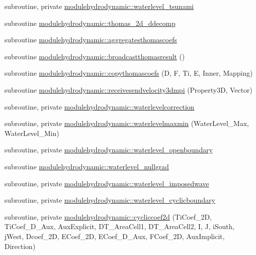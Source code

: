 \begin{DoxyCompactItemize}
subroutine, private \mbox{\hyperlink{namespacemodulehydrodynamic_af4cd55d170e7b64149a737b5bbe9951c}{modulehydrodynamic\+::waterlevel\+\_\+tsunami}}
\item 
subroutine \mbox{\hyperlink{namespacemodulehydrodynamic_ac03117b3b11b92ebf56eb60fad884b0b}{modulehydrodynamic\+::thomas\+\_\+2d\+\_\+ddecomp}}
\item 
subroutine \mbox{\hyperlink{namespacemodulehydrodynamic_a0d43e324a40d96741fa99e647c0d0e01}{modulehydrodynamic\+::aggregatesthomascoefs}}
\item 
subroutine \mbox{\hyperlink{namespacemodulehydrodynamic_a3dc68350b123c83700a52b23bdbf8151}{modulehydrodynamic\+::broadcastthomasresult}} ()
\item 
subroutine \mbox{\hyperlink{namespacemodulehydrodynamic_a080df16267de295975f460ddb4cba152}{modulehydrodynamic\+::copythomascoefs}} (D, F, Ti, E, Inner, Mapping)
\item 
subroutine \mbox{\hyperlink{namespacemodulehydrodynamic_a60fe8dcc9369b6f2caa9b97647a7f605}{modulehydrodynamic\+::receivesendvelocity3dmpi}} (Property3D, Vector)
\item 
subroutine, private \mbox{\hyperlink{namespacemodulehydrodynamic_a1adc02badc9c5130d372cfb28e43f796}{modulehydrodynamic\+::waterlevelcorrection}}
\item 
subroutine, private \mbox{\hyperlink{namespacemodulehydrodynamic_a4c31b8fb87415bace90b12dd41376ef4}{modulehydrodynamic\+::waterlevelmaxmin}} (Water\+Level\+\_\+\+Max, Water\+Level\+\_\+\+Min)
\item 
subroutine, private \mbox{\hyperlink{namespacemodulehydrodynamic_abc3f56e92d973f39a2bde89ee0ee561f}{modulehydrodynamic\+::waterlevel\+\_\+openboundary}}
\item 
subroutine \mbox{\hyperlink{namespacemodulehydrodynamic_a3a81c2f0eddf64c038d5a82241029379}{modulehydrodynamic\+::waterlevel\+\_\+nullgrad}}
\item 
subroutine, private \mbox{\hyperlink{namespacemodulehydrodynamic_a25549ff328b3933642ae5a9112a7d2ba}{modulehydrodynamic\+::waterlevel\+\_\+imposedwave}}
\item 
subroutine, private \mbox{\hyperlink{namespacemodulehydrodynamic_a07cbcb571bac038116c36df1b277df63}{modulehydrodynamic\+::waterlevel\+\_\+cyclicboundary}}
\item 
subroutine, private \mbox{\hyperlink{namespacemodulehydrodynamic_a51f796ba1d401f24370c5f9dd5ec71ae}{modulehydrodynamic\+::cycliccoef2d}} (Ti\+Coef\+\_\+2D, Ti\+Coef\+\_\+D\+\_\+\+Aux, Aux\+Explicit, D\+T\+\_\+\+Area\+Cell1, D\+T\+\_\+\+Area\+Cell2, I, J, i\+South, j\+West, Dcoef\+\_\+2D, E\+Coef\+\_\+2D, E\+Coef\+\_\+D\+\_\+\+Aux, F\+Coef\+\_\+2D, Aux\+Implicit, Direction)

\end{DoxyCompactItemize}
